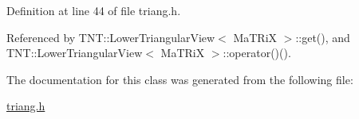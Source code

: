 Definition at line 44 of file triang.h.



Referenced by TNT::LowerTriangularView$<$ MaTRiX $>$::get(), and TNT::LowerTriangularView$<$ MaTRiX $>$::operator()().



The documentation for this class was generated from the following file:\begin{DoxyCompactItemize}
\item 
\hyperlink{triang_8h}{triang.h}\end{DoxyCompactItemize}
